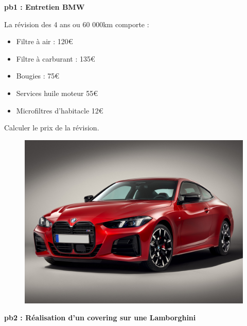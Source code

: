 \textbf{pb1 : Entretien BMW} \\

\begin{multicols}{2}

La révision des 4 ans ou 60 000km comporte : 

\begin{itemize}[label={$\bullet$}]
  \item Filtre à air : 120€
  \item Filtre à carburant : 135€
  \item Bougies : 75€ 
  \item Services huile moteur 55€
  \item Microfiltres d'habitacle 12€  
\end{itemize} 

Calculer le prix de la révision. \columnbreak

\begin{figure}[H]
  \centering
  \includegraphics[width=0.6\linewidth]{5x2-inegalite-triangulaire/bmw.jpg}
\end{figure}

\end{multicols}

\textbf{pb2 : Réalisation d'un covering sur une Lamborghini} \\

